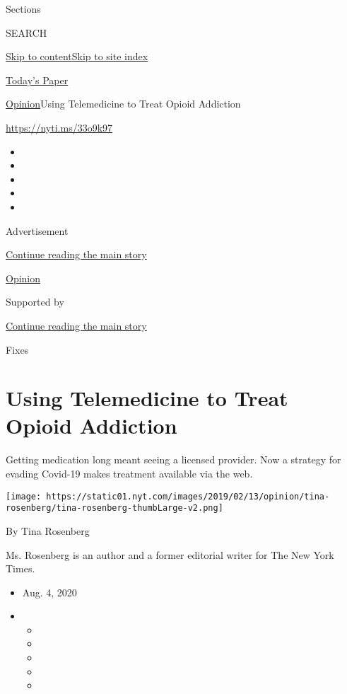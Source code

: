 Sections

SEARCH

\protect\hyperlink{site-content}{Skip to
content}\protect\hyperlink{site-index}{Skip to site index}

\href{https://myaccount.nytimes.com/auth/login?response_type=cookie\&client_id=vi}{}

\href{https://www.nytimes.com/section/todayspaper}{Today's Paper}

\href{/section/opinion}{Opinion}\textbar{}Using Telemedicine to Treat
Opioid Addiction

\href{https://nyti.ms/33o9k97}{https://nyti.ms/33o9k97}

\begin{itemize}
\item
\item
\item
\item
\item
\end{itemize}

Advertisement

\protect\hyperlink{after-top}{Continue reading the main story}

\href{/section/opinion}{Opinion}

Supported by

\protect\hyperlink{after-sponsor}{Continue reading the main story}

Fixes

\hypertarget{using-telemedicine-to-treat-opioid-addiction}{%
\section{Using Telemedicine to Treat Opioid
Addiction}\label{using-telemedicine-to-treat-opioid-addiction}}

Getting medication long meant seeing a licensed provider. Now a strategy
for evading Covid-19 makes treatment available via the web.

\texttt{[image: https://static01.nyt.com/images/2019/02/13/opinion/tina-rosenberg/tina-rosenberg-thumbLarge-v2.png]}

By Tina Rosenberg

Ms. Rosenberg is an author and a former editorial writer for The New
York Times.

\begin{itemize}
\item
  Aug. 4, 2020
\item
  \begin{itemize}
  \item
  \item
  \item
  \item
  \item
  \end{itemize}
\end{itemize}

